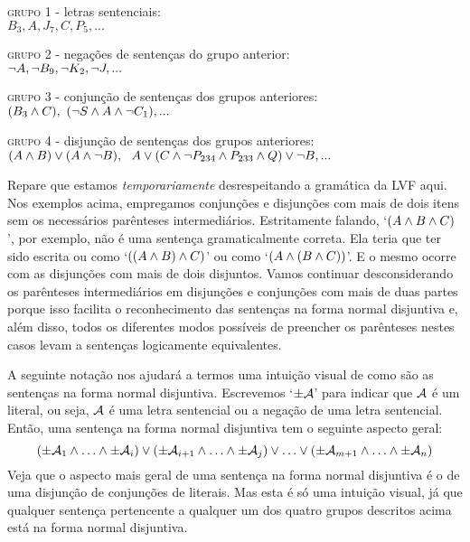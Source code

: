 \begin{earg}
		\item[\textsc{grupo 1} - letras sentenciais:] \ \\
				$B_3, A, J_7, C, P_5,...$
		\item[\textsc{grupo 2} - negações de sentenças do grupo anterior:] \ \\
				$\neg A, \neg B_9, \neg K_2, \neg J,... $
		\item[\textsc{grupo 3} - conjunção de sentenças dos grupos anteriores:] \ \\
				$(B_3 \wedge C), \ (\neg S \wedge A \wedge \neg C_1),...$
		\item[\textsc{grupo 4} - disjunção de sentenças dos grupos anteriores:] \ \\ 
				$(A \wedge B) \vee (A \wedge \neg B),\ \  A \vee (C \wedge \neg P_{234} \wedge P_{233} \wedge Q) \vee \neg B,...$
	\end{earg}
Repare que estamos \emph{temporariamente} desrespeitando a gramática da LVF aqui. 
Nos exemplos acima, empregamos conjunções e disjunções com mais de dois itens sem os necessários parênteses intermediários.
Estritamente falando, `$(A \wedge B \wedge C)$', por exemplo, não é uma sentença gramaticalmente correta. Ela teria que ter sido escrita ou como `$((A \wedge B) \wedge C)$' ou como `$(A \wedge (B \wedge C))$'. 
E o mesmo ocorre com as disjunções com mais de dois disjuntos.
Vamos continuar desconsiderando os parênteses intermediários em disjunções e conjunções com mais de duas partes porque isso facilita o reconhecimento das sentenças na forma normal disjuntiva e, além disso, todos os diferentes modos possíveis de preencher os parênteses nestes casos levam a sentenças logicamente equivalentes.

A seguinte notação nos ajudará a termos uma intuição visual de como são as sentenças na forma normal disjuntiva.
Escrevemos `$\pm \mathcal{A}$' para indicar que $\mathcal{A}$ é um literal, ou seja, $\mathcal{A}$ é uma letra sentencial ou a negação de uma letra sentencial.
Então, uma sentença na forma normal disjuntiva tem o seguinte aspecto geral:
	$$(\pm \mathcal{A}_1 \land \ldots \land \pm \mathcal{A}_i) \lor (\pm \mathcal{A}_{i+1} \land \ldots \land \pm\mathcal{A}_j) \lor \ldots \lor (\pm\mathcal{A}_{m+1} \land \ldots \land \pm \mathcal{A}_n)$$
Veja que o aspecto mais geral de uma sentença na forma normal disjuntiva é o de uma disjunção de conjunções de literais.
Mas esta é só uma intuição visual, já que qualquer sentença pertencente a  qualquer um dos quatro grupos descritos acima está na forma normal disjuntiva.

